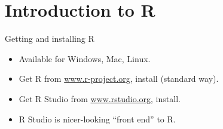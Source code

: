 \section{Introduction to R}
\frame{\sectionpage}

\begin{frame}{Getting and installing R}
  
  \begin{itemize}
  \item Available for Windows, Mac, Linux.
  \item Get R from \url{www.r-project.org}, install (standard way).
  \item Get R Studio from \url{www.rstudio.org}, install.
  \item R Studio is nicer-looking ``front end'' to R.
  \end{itemize}
  
\end{frame}

